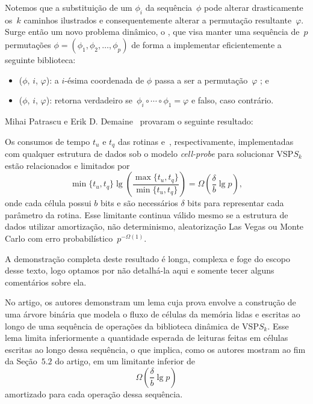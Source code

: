 Notemos que a substituição de um $\phi_i$ da sequência~$\phi$ pode alterar drasticamente os~$k$ caminhos ilustrados e consequentemente alterar a permutação resultante~$\varphi$. Surge então um novo problema dinâmico, o , que visa manter uma sequência de~$p$ permutações ${\phi=(\phi_1, \phi_2, \ldots, \phi_p)}$ de forma a implementar eficientemente a seguinte biblioteca:
\begin{itemize}
\item \VPSPupdate($\phi$, $i$, $\varphi$): a $i$-ésima coordenada de $\phi$ passa a ser a permutação~$\varphi$ ; e
\item \VPSPverify($\phi$, $i$, $\varphi$): retorna verdadeiro se~$\phi_i\circ \cdots\circ \phi_1 = \varphi$ e falso, caso contrário.
\end{itemize}

Mihai Patrascu e Erik D. Demaine~\cite{lowerBoundPatrascu} provaram o seguinte resultado:

\begin{theorem}
\label{theo:lim}
Os consumos de tempo $t_u$ e $t_q$ das rotinas \VPSPupdate{} e~\VPSPverify, respectivamente, implementadas com qualquer estrutura de dados sob o modelo \textit{cell-probe} para solucionar VSP$S_k$ estão relacionados e limitados por
$$
\min\{t_u,t_q\}\lg \left( \frac{\max\{t_u,t_q\}}{\min\{t_u,t_q\}}\right) = \Omega\left(\frac{\delta}{b}\lg p\right),
$$
onde cada célula possui $b$ bits e são necessários $\delta$ bits para representar cada parâmetro da rotina.  Esse limitante continua válido mesmo se a estrutura de dados utilizar amortização, não determinismo, aleatorização Las Vegas ou Monte Carlo com erro probabilístico~$p^{-\Omega(1)}$.
\end{theorem}

A demonstração completa deste resultado é longa, complexa e foge do escopo desse texto, logo optamos por não detalhá-la aqui e somente tecer alguns comentários sobre ela.

No artigo, os autores demonstram um lema \cite[Lema~5.1]{lowerBoundPatrascu} cuja prova envolve a construção de uma árvore binária que modela o fluxo de células da memória lidas e escritas ao longo de uma sequência de operações da biblioteca dinâmica de VSP$S_k$. Esse lema limita inferiormente a quantidade esperada de leituras feitas em células escritas ao longo dessa sequência, o que implica, como os autores mostram ao fim da Seção~$5.2$ do artigo, em um limitante inferior de
\begin{equation}
    \Omega\left(\frac{\delta}{b}\lg p\right) \label{eq:lim}
\end{equation}
amortizado para cada operação dessa sequência.

